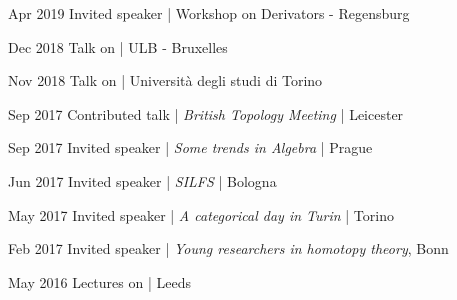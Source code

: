 \begin{eyenumerate}
   \item {}
   {Apr 2019}
   {Invited speaker | Workshop on Derivators - Regensburg}
   \item {}
   {Dec 2018}
   {Talk on  | ULB - Bruxelles}
   \item {}
   {Nov 2018}
   {Talk on  | Università degli studi di Torino}
   \item {}
   {Sep 2017}
   {Contributed talk | \emph{British Topology Meeting} | Leicester}
   \item {}
   {Sep 2017}
   {Invited speaker | \emph{Some trends in Algebra} | Prague}
   \item {}
   {Jun 2017}
   {Invited speaker | \emph{SILFS} | Bologna}
   \item {}
   {May 2017}
   {Invited speaker | \emph{A categorical day in Turin} | Torino}
   \item {}
   {Feb 2017}
   {Invited speaker | \emph{Young researchers in homotopy theory}, Bonn}
   \item {}
   {May 2016}
   {Lectures on  | Leeds}
\end{eyenumerate}
